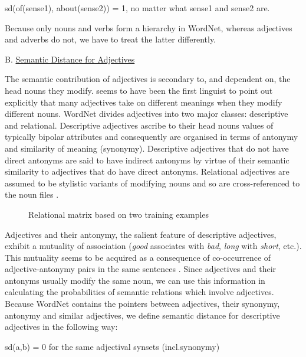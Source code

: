 \hspace*{2cm}
          sd(of(sense1), about(sense2)) = 1, no matter what sense1 and sense2 are.

Because only nouns and verbs form a hierarchy in WordNet, whereas adjectives and adverbs do not, we have to treat the latter differently.

\noindent
B. \underline{Semantic Distance for Adjectives}

The semantic contribution of adjectives is secondary to, and dependent on, the head nouns they modify. \cite{Sapir44} seems to have been the first linguist to point out explicitly that many adjectives take on different meanings when they modify different nouns. WordNet divides adjectives into two major classes: descriptive and relational. Descriptive adjectives ascribe to their head nouns values of typically bipolar attributes and consequently are organised in terms of antonymy and similarity of meaning (synonymy). Descriptive adjectives that do not have direct antonyms are said to have indirect antonyms by virtue of their semantic similarity to adjectives that do have direct antonyms. Relational adjectives are assumed to be stylistic variants of modifying nouns and so are cross-referenced to the noun files \cite{Miller90A}.

\begin{figure}[t]
  \leavevmode
  \begin{center}
    \caption{Relational matrix based on two training examples}
    \label{fig:3}
  \end{center}
\end{figure}

Adjectives and their antonymy, the salient feature of descriptive adjectives, exhibit a mutuality of association \cite{Deese64} ({\it good} associates with {\it bad}, {\it long} with {\it short}, etc.). This mutuality seems to be acquired as a consequence of co-occurrence of adjective-antonymy pairs in the same sentences \cite{JK91}. Since adjectives and their antonyms usually modify the same noun, we can use this information in calculating the probabilities of semantic relations which involve adjectives. Because WordNet contains the pointers between adjectives, their synonymy, antonymy and similar adjectives, we define semantic distance for descriptive adjectives in the following way:

\hspace*{1cm}
    sd(a,b) = 0 for the same adjectival synsets (incl.synonymy)

